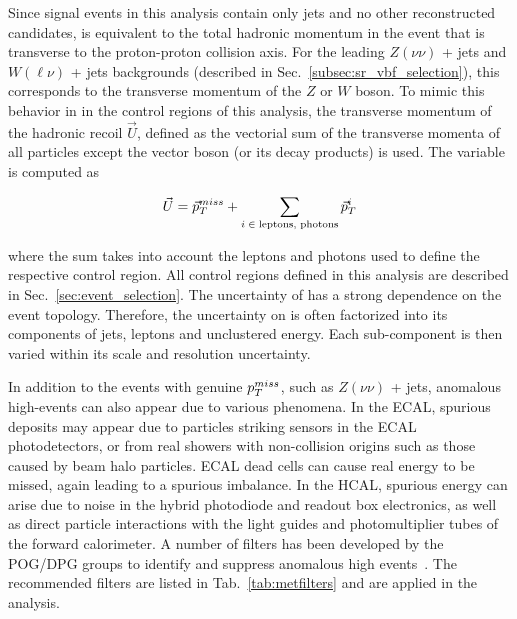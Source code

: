 Since \hinv signal events in this analysis contain only jets and no other reconstructed candidates,
\ptmiss is equivalent to the total hadronic momentum in the event that is transverse to the proton-proton collision axis. 
For the leading $Z(\nu\nu)$ + jets and $W(\ell\nu)$ + jets backgrounds (described in Sec.~\ref{subsec:sr_vbf_selection}), 
this corresponds to the transverse momentum of the $Z$ or $W$ boson. 
To mimic this behavior in in the control regions of this analysis, the transverse
momentum of the hadronic recoil $\vec{U}$, defined as the vectorial sum of the transverse
momenta of all particles except the vector boson (or its decay products) is used.
The variable is computed as

\begin{equation}
  \vec{U} = \vec{p}_{T}^{miss} + \sum _{i\;\in\;\textrm{leptons, photons}}\vec{p}^{i}_{T}
  \label{eq:recoil_def}
\end{equation}

where the sum takes into account the leptons and photons used to define the respective control region.
All control regions defined in this analysis are described in Sec.~\ref{sec:event_selection}.
The uncertainty of \ptmiss has a strong dependence on the
event topology. Therefore, the uncertainty on \ptmiss is often factorized into its components of
jets, leptons and unclustered energy. Each sub-component is then varied
within its scale and resolution uncertainty.

In addition to the events with genuine $p_T^{miss}$, such as $Z(\nu\nu)$ + jets, 
anomalous high-\ptmiss events can also appear due to various phenomena.
In the ECAL, spurious deposits may appear due to particles striking
sensors in the ECAL photodetectors, or from real showers with non-collision
origins such as those caused by beam halo particles. ECAL dead cells can cause real
energy to be missed, again leading to a spurious imbalance.
In the HCAL, spurious energy can arise due to  noise in the hybrid
photodiode and readout box  electronics, as well as
direct particle interactions with  the light guides and
photomultiplier tubes of the forward calorimeter. 
A number of filters has been developed by the POG/DPG groups to identify and suppress anomalous high
\ptmiss events~\cite{CMS-JME-TWIKI-FILTER}. The recommended filters are listed in Tab.~\ref{tab:metfilters} and are applied in the analysis.

